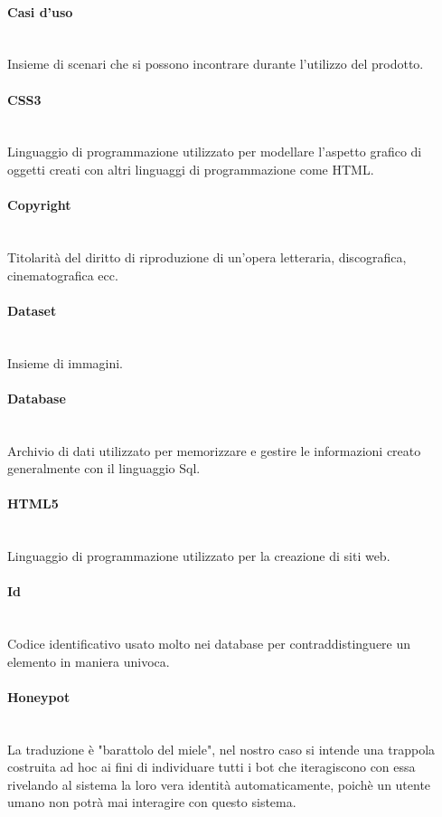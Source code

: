 \paragraph{Casi d'uso}~\smallskip \\
Insieme di scenari che si possono incontrare durante l'utilizzo del prodotto.

\paragraph{CSS3}~\smallskip \\
Linguaggio di programmazione utilizzato per modellare l'aspetto grafico di oggetti creati con altri linguaggi di programmazione come HTML.

\paragraph{Copyright}~\smallskip \\
Titolarità del diritto di riproduzione di un'opera letteraria, discografica, cinematografica ecc.

\paragraph{Dataset}~\smallskip \\
Insieme di immagini.

\paragraph{Database}~\smallskip \\
Archivio di dati utilizzato per memorizzare e gestire le informazioni creato generalmente con il linguaggio Sql.

\paragraph{HTML5}~\smallskip \\
Linguaggio di programmazione utilizzato per la creazione di siti web.

\paragraph{Id}~\smallskip \\
Codice identificativo usato molto nei database per contraddistinguere un elemento in maniera univoca.

\paragraph{Honeypot}~\smallskip \\
La traduzione è "barattolo del miele", nel nostro caso si intende una trappola costruita ad hoc ai fini di individuare tutti i bot che iteragiscono con essa rivelando al sistema la loro vera identità automaticamente, poichè un utente umano non potrà mai interagire con questo sistema.

